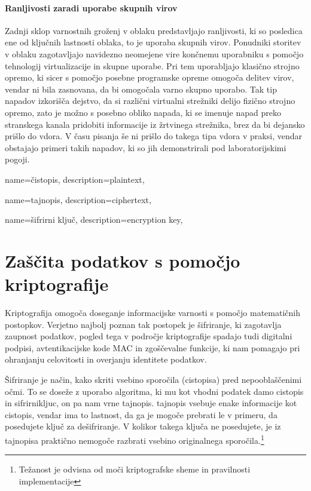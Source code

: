 \documentclass[12pt,a4paper,openany]{book}
\begin{document}
\subsubsection{Ranljivosti zaradi uporabe skupnih virov}
Zadnji sklop varnostnih groženj v oblaku predstavljajo ranljivosti, ki so posledica ene od ključnih lastnosti oblaka, to je uporaba skupnih virov. Ponudniki storitev v oblaku zagotavljajo navidezno neomejene vire končnemu uporabniku s pomočjo tehnologij virtualizacije in skupne uporabe. Pri tem uporabljajo klasično strojno opremo, ki sicer s pomočjo posebne programske opreme omogoča delitev virov, vendar ni bila zasnovana, da bi omogočala varno skupno uporabo. Tak tip napadov izkorišča dejstvo, da si različni virtualni strežniki delijo fizično strojno opremo, zato je možno s posebno obliko napada, ki se imenuje napad preko stranskega kanala pridobiti informacije iz žrtvinega strežnika, brez da bi dejansko prišlo do vdora. V času pisanja še ni prišlo do takega tipa vdora v praksi, vendar obstajajo primeri takih napadov, ki so jih demonstrirali pod laboratorijskimi pogoji.


{
  name=čistopis,
  description={plaintext},
}


{
  name=tajnopis,
  description={ciphertext},
}

{
  name=šifrirni ključ,
  description={encryption key},
}


\chapter{Zaščita podatkov s pomočjo kriptografije}

Kriptografija omogoča doseganje informacijske varnosti s pomočjo matematičnih postopkov. Verjetno najbolj poznan tak postopek je šifriranje, ki zagotavlja zaupnost podatkov, pogled tega v področje kriptografije spadajo tudi digitalni podpisi, avtentikacijske kode MAC in zgoščevalne funkcije, ki nam pomagajo pri ohranjanju celovitosti in overjanju identitete podatkov.

Šifriranje je način, kako skriti vsebino sporočila (\gls{cistopis}a) pred nepooblaščenimi očmi. To se doseže z uporabo algoritma, ki mu kot vhodni podatek damo \gls{cistopis} in \gls{sifrirnikljuc}, on pa nam vrne \gls{tajnopis}. \Gls{tajnopis} vsebuje enake informacije kot \gls{cistopis}, vendar ima to lastnost, da ga je mogoče prebrati le v primeru, da posedujete ključ za dešifriranje. V kolikor takega ključa ne posedujete, je iz \gls{tajnopis}a praktično nemogoče razbrati vsebino originalnega sporočila.\footnote{Težanost je odvisna od moči kriptografske sheme in pravilnosti implementacije}
\end{document}
